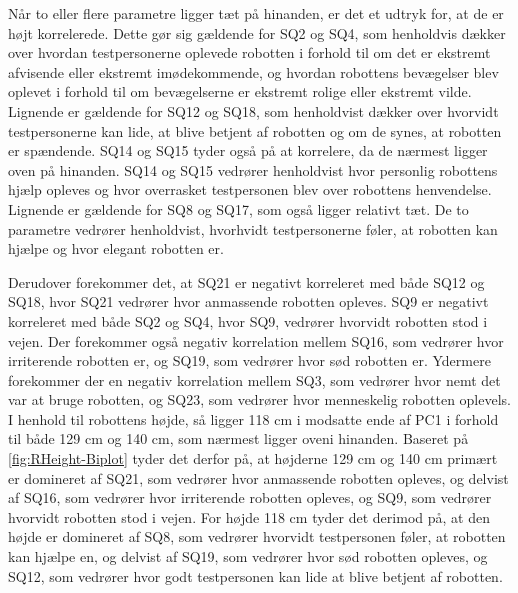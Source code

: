 \noindent
%
Når to eller flere parametre ligger tæt på hinanden, er det et udtryk for, at de er højt korrelerede. Dette gør sig gældende for SQ2 og SQ4, som henholdvis dækker over hvordan testpersonerne oplevede robotten i forhold til om det er ekstremt afvisende eller ekstremt imødekommende, og hvordan robottens bevægelser blev oplevet i forhold til om bevægelserne er ekstremt rolige eller ekstremt vilde. Lignende er gældende for SQ12 og SQ18, som henholdvist dækker over hvorvidt testpersonerne kan lide, at blive betjent af robotten og om de synes, at robotten er spændende. SQ14 og SQ15 tyder også på at korrelere, da de nærmest ligger oven på hinanden. SQ14 og SQ15 vedrører henholdvist hvor personlig robottens hjælp opleves og hvor overrasket testpersonen blev over robottens henvendelse. Lignende er gældende for SQ8 og SQ17, som også ligger relativt tæt. De to parametre vedrører henholdvist, hvorhvidt testpersonerne føler, at robotten kan hjælpe og hvor elegant robotten er. 

Derudover forekommer det, at SQ21 er negativt korreleret med både SQ12 og SQ18, hvor SQ21 vedrører hvor anmassende robotten opleves. SQ9 er negativt korreleret med både SQ2 og SQ4, hvor SQ9, vedrører hvorvidt robotten stod i vejen. Der forekommer også negativ korrelation mellem SQ16, som vedrører hvor irriterende robotten er, og SQ19, som vedrører hvor sød robotten er. Ydermere forekommer der en negativ korrelation mellem SQ3, som vedrører hvor nemt det var at bruge robotten, og SQ23, som vedrører hvor menneskelig robotten oplevels.\blankline
%
I henhold til robottens højde, så ligger 118 cm i modsatte ende af PC1 i forhold til både 129 cm og 140 cm, som nærmest ligger oveni hinanden. Baseret på \autoref{fig:RHeight-Biplot} tyder det derfor på, at højderne 129 cm og 140 cm primært er domineret af SQ21, som vedrører hvor anmassende robotten opleves, og delvist af SQ16, som vedrører hvor irriterende robotten opleves, og SQ9, som vedrører hvorvidt robotten stod i vejen. For højde 118 cm tyder det derimod på, at den højde er domineret af SQ8, som vedrører hvorvidt testpersonen føler, at robotten kan hjælpe en, og delvist af SQ19, som vedrører hvor sød robotten opleves, og SQ12, som vedrører hvor godt testpersonen kan lide at blive betjent af robotten. 

